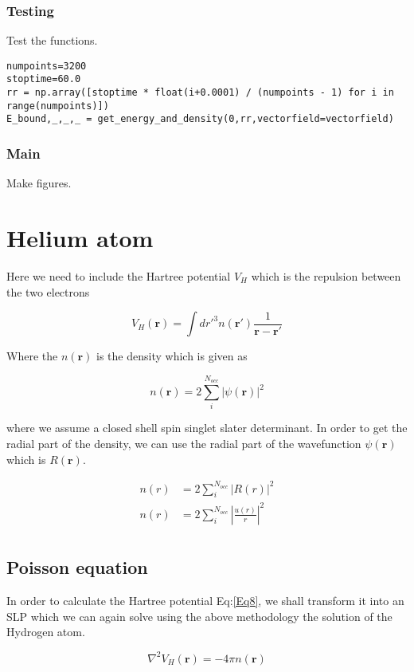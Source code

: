 \documentclass[11pt,a4paper]{article}
\begin{document}
\subsubsection{Testing}
\label{sec:org1b51349}
Test the functions.
\begin{verbatim}
numpoints=3200
stoptime=60.0
rr = np.array([stoptime * float(i+0.0001) / (numpoints - 1) for i in range(numpoints)])
E_bound,_,_,_ = get_energy_and_density(0,rr,vectorfield=vectorfield)
\end{verbatim}
\subsubsection{Main}
\label{sec:org66fab06}
Make figures.

\section{Helium atom}
\label{sec:org219ad1a}
Here we need to include the Hartree potential \(V_H\) which is the
repulsion between the two electrons

\[
V_H(\mathbf{r}) = \int dr'^3 n(\mathbf{r}')\frac{1}{\mathbf{r}-\mathbf{r}'}
\]

Where the \(n(\mathbf{r})\) is the density which is given as

\[
n(\mathbf{r}) = 2\sum_i^{N_{occ}} |\psi(\mathbf{r})|^2
\]

where we assume a closed shell spin singlet slater determinant.
In order to get the radial part of the density, we can use the
radial part of the wavefunction \(\psi(\mathbf{r})\) which is \(R(\mathbf{r})\).

\begin{align*}
n(r) &= 2\sum_i^{N_{occ}} |R(r)|^2 \\
n(r) &= 2\sum_i^{N_{occ}} \left |\frac{u(r)}{r}\right|^2 \\
\end{align*}


\subsection{Poisson equation}
\label{sec:org56b7f3a}

In order to calculate the Hartree potential Eq:\ref{Eq8}, we shall
transform it into an SLP which we can again solve using the
above methodology the solution of the Hydrogen atom.

\[
\nabla^2 V_H(\mathbf{r}) = -4 \pi n(\mathbf{r})
\]
\end{document}

